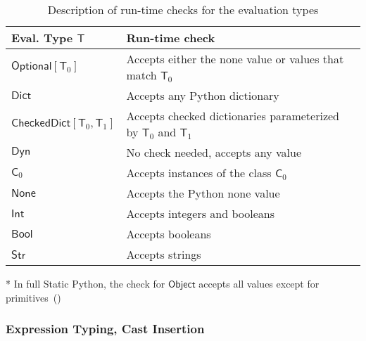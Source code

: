 \documentclass[english,cleveref,crc]{programming}
\newcommand{\SP}{Static Python}
\newcommand{\typefont}[1]{\mathsf{#1}}
\newcommand{\paramtype}[2]{#1[#2]}
\newcommand{\spteval}{\typefont{T}}
\newcommand{\sptclass}{\typefont{C}}
\newcommand{\sptint}{\typefont{Int}}
\newcommand{\sptstr}{\typefont{Str}}
\newcommand{\sptbool}{\typefont{Bool}}
\newcommand{\sptdyn}{\typefont{Dyn}}
\newcommand{\sptobject}{\typefont{Object}}
\newcommand{\sptnone}{\typefont{None}}
\newcommand{\sptoptional}[1]{\paramtype{\typefont{Optional}}{#1}}
\newcommand{\sptrawpydict}{\typefont{Dict}}
\newcommand{\sptrawchkdict}{\typefont{CheckedDict}} %
\newcommand{\sptchkdict}[2]{\paramtype{\sptrawchkdict}{#1, #2}}
\begin{document}
\begin{table}[t]
  \begin{threeparttable}
  \centering
  \caption{Description of run-time checks for the evaluation types}
  \label{t:cast}

    \begin{tabular}{l@{\quad}l}
    \toprule
    {Eval. Type $\spteval$} & {Run-time check} \\\midrule
    $\sptoptional{\spteval_0}$ & {Accepts either the none value or values that match $\spteval_0$} \\
    $\sptrawpydict$ & {Accepts any Python dictionary} \\
    $\sptchkdict{\spteval_0}{\spteval_1}$ & {Accepts checked dictionaries parameterized by $\spteval_0$ and $\spteval_1$} \\
    $\sptdyn$ & {No check needed, accepts any value} \\
    $\sptclass_0$ & {Accepts instances of the class $\sptclass_0$\tnote{*}} \\
    $\sptnone$ & {Accepts the Python none value} \\
    $\sptint$ & {Accepts integers and booleans} \\
    $\sptbool$ & {Accepts booleans} \\
    $\sptstr$ & {Accepts strings} \\
    \bottomrule
    \end{tabular}

    \begin{tablenotes}
    \item {*} {\footnotesize In full \SP{}, the check for $\sptobject$ accepts all values except for primitives~()}
    \end{tablenotes}
\end{threeparttable}
\end{table}


\subsubsection{Expression Typing, Cast Insertion}
\end{document}
